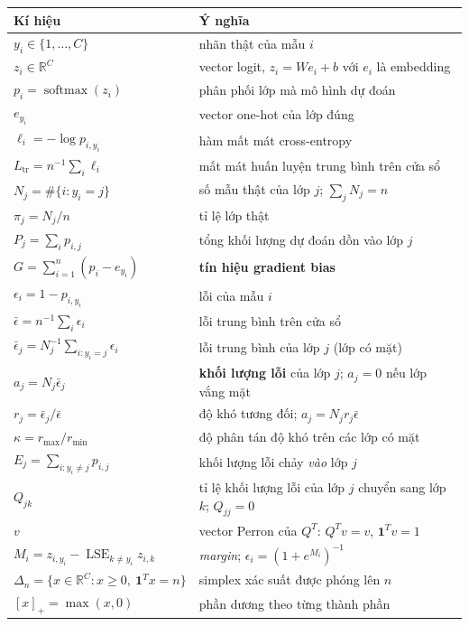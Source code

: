 \documentclass[11pt]{article}
\theoremstyle{remark}
\newcommand{\R}{\mathbb{R}}
\newcommand{\one}{\mathbf{1}}
\newcommand{\pos}[1]{\left[#1\right]_+}
\newcommand{\simplex}{\Delta_n}
\DeclareMathOperator{\softmaxop}{softmax}
\DeclareMathOperator{\LSEop}{LSE}
\begin{document}
\begin{center}
\footnotesize
\begin{tabular}{@{}ll@{}}
\toprule
Kí hiệu & Ý nghĩa \\
\midrule
$y_i \in \{1,\dots,C\}$ & nhãn thật của mẫu $i$ \\
$z_i \in \R^C$ & vector logit, $z_i = W e_i + b$ với $e_i$ là embedding \\
$p_i = \softmaxop(z_i)$ & phân phối lớp mà mô hình dự đoán \\
$e_{y_i}$ & vector one-hot của lớp đúng \\
$\ell_i = -\log p_{i,y_i}$ & hàm mất mát cross-entropy \\
$L_{\mathrm{tr}} = n^{-1}\sum_i \ell_i$ & mất mát huấn luyện trung bình trên cửa sổ \\
\midrule
$N_j = \#\{i : y_i = j\}$ & số mẫu thật của lớp $j$; $\sum_j N_j = n$ \\
$\pi_j = N_j/n$ & tỉ lệ lớp thật \\
$P_j = \sum_i p_{i,j}$ & tổng khối lượng dự đoán dồn vào lớp $j$ \\
$G = \sum_{i=1}^n (p_i - e_{y_i})$ & \textbf{tín hiệu gradient bias} \\
\midrule
$\epsilon_i = 1 - p_{i,y_i}$ & lỗi của mẫu $i$ \\
$\bar\epsilon = n^{-1}\sum_i \epsilon_i$ & lỗi trung bình trên cửa sổ \\
$\bar\epsilon_j = N_j^{-1}\sum_{i:y_i=j}\epsilon_i$ & lỗi trung bình của lớp $j$ (lớp có mặt) \\
$a_j = N_j \bar\epsilon_j$ & \textbf{khối lượng lỗi} của lớp $j$; $a_j = 0$ nếu lớp vắng mặt \\
$r_j = \bar\epsilon_j/\bar\epsilon$ & độ khó tương đối; $a_j = N_j r_j \bar\epsilon$ \\
$\kappa = r_{\max}/r_{\min}$ & độ phân tán độ khó trên các lớp có mặt \\
\midrule
$E_j = \sum_{i:y_i\ne j} p_{i,j}$ & khối lượng lỗi chảy \emph{vào} lớp $j$ \\
$Q_{jk}$ & tỉ lệ khối lượng lỗi của lớp $j$ chuyển sang lớp $k$; $Q_{jj}=0$ \\
$v$ & vector Perron của $Q^T$: $Q^Tv = v$, $\one^Tv=1$ \\
\midrule
$M_i = z_{i,y_i} - \LSEop_{k\ne y_i} z_{i,k}$ & \emph{margin}; $\epsilon_i = (1+e^{M_i})^{-1}$ \\
$\simplex = \{x \in \R^C : x \ge 0,\ \one^Tx = n\}$ & simplex xác suất được phóng lên $n$ \\
$\pos{x} = \max(x,0)$ & phần dương theo từng thành phần \\
\bottomrule
\end{tabular}
\end{center}
\end{document}
